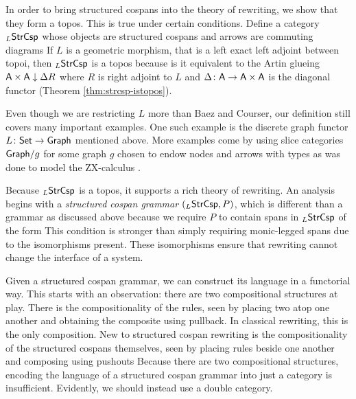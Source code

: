 \documentclass{amsart}
\begin{document}
In order to bring structured cospans into the
theory of rewriting, we show that they form a
topos. This is true under certain conditions.
Define a category $ _L\mathsf{StrCsp} $ whose objects are
structured cospans and arrows are commuting
diagrams  If $ L $
is a geometric morphism, that is a left exact left
adjoint between topoi, then $ _L\mathsf{StrCsp} $ is a topos because is
it equivalent to the Artin glueing
$ \mathsf{A} \times \mathsf{A} \downarrow \Delta R $ where $ R $
is right adjoint to $ L $ and
$ \Delta \colon \mathsf{A} \to \mathsf{A} \times \mathsf{A} $ is the
diagonal functor (Theorem \ref{thm:strcsp-istopos}).

Even though we are restricting $ L $ more than
Baez and Courser, our definition still covers many
important examples.  One such example is the
discrete graph functor $ L \colon \mathsf{Set} \to \mathsf{Graph} $
mentioned above. More examples come by using slice
categories $ \mathsf{Graph} / g $ for some graph $ g $
chosen to endow nodes and arrows with types as was
done to model the ZX-calculus \cite{ZX}.

Because $ _L\mathsf{StrCsp} $ is a topos, it supports a
rich theory of rewriting. An analysis begins with
a \emph{structured cospan grammar}
$ (_L\mathsf{StrCsp}, P) $, which is different than a
grammar as discussed above because we require
$ P $ to contain spans in $ _L\mathsf{StrCsp} $ of the
form  This condition
is stronger than simply requiring monic-legged
spans due to the isomorphisms present. These
isomorphisms ensure that rewriting cannot change
the interface of a system. 

Given a structured cospan grammar, we can
construct its language in a functorial way.  This
starts with an observation: there are two
compositional structures at play. There is the
compositionality of the rules, seen by placing two
atop one another
 and obtaining
the composite 
using pullback. In classical rewriting, this
is the only composition.  New to structured cospan
rewriting is the compositionality of the
structured cospans themselves, seen by placing
rules beside one another
 and composing
using pushouts 
Because there are two compositional structures,
encoding the language of a structured cospan
grammar into just a category is insufficient.
Evidently, we should instead use a double
category.
\end{document}
